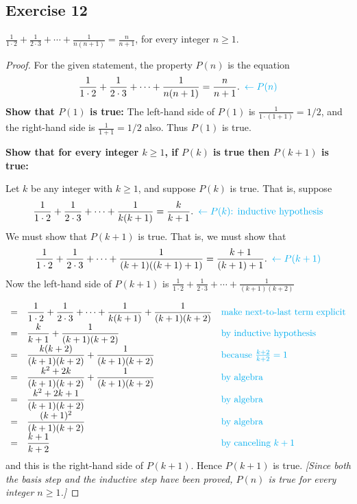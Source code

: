 \documentclass[14pt]{extarticle}
\newcommand{\dps}{\displaystyle}
\newcommand{\from}{\leftarrow}
\newcommand{\cy}{\color{cyan}}
\begin{document}
\subsection{Exercise 12}
$\dps \frac{1}{1 \cdot 2} + \frac{1}{2 \cdot 3} + \cdots + \frac{1}{n(n+1)} = \frac{n}{n+1}$, for every integer $n \geq 1$.

\begin{proof}
For the given statement, the property $P(n)$ is the equation
\[
\dps \frac{1}{1 \cdot 2} + \frac{1}{2 \cdot 3} + \cdots + \frac{1}{n(n+1)} = \frac{n}{n+1}. \,\,\, {\cy \from P(n)}
\]
{\bf Show that $P(1)$ is true:} The left-hand side of $P(1)$ is $\frac{1}{1\cdot (1+1)} = 1/2$, and the right-hand side is $\frac{1}{1+1} = 1/2$ also. Thus $P(1)$ is true.

{\bf Show that for every integer $k \geq 1$, if $P(k)$ is true then $P(k + 1)$ is true:}

Let $k$ be any integer with $k \geq 1$, and suppose $P(k)$ is true. That is, suppose
\[
\dps \frac{1}{1 \cdot 2} + \frac{1}{2 \cdot 3} + \cdots + \frac{1}{k(k+1)} = \frac{k}{k+1}. \,\,\, {\cy \from P(k) \text{: inductive hypothesis}}
\]
We must show that $P(k + 1)$ is true. That is, we must show that
\[
\dps \frac{1}{1 \cdot 2} + \frac{1}{2 \cdot 3} + \cdots + \frac{1}{(k+1)((k+1)+1)} = \frac{k+1}{(k+1)+1}. \,\,\,{\cy \from P(k+1)}
\]
Now the left-hand side of $P(k + 1)$ is $\dps \frac{1}{1 \cdot 2} + \frac{1}{2 \cdot 3} + \cdots + \frac{1}{(k+1)(k+2)}$

\[
\begin{array}{lll}
= & \dps \frac{1}{1 \cdot 2} + \frac{1}{2 \cdot 3} + \cdots + \frac{1}{k(k+1)} + \frac{1}{(k+1)(k+2)} & \text{\cy make next-to-last term explicit} \\
= & \dps \frac{k}{k+1} + \frac{1}{(k+1)(k+2)} & \text{\cy by inductive hypothesis} \\
= & \dps \frac{k(k+2)}{(k+1)(k+2)} + \frac{1}{(k+1)(k+2)} & \text{\cy because $\frac{k+2}{k+2} = 1$} \\
= & \dps \frac{k^2+2k}{(k+1)(k+2)} + \frac{1}{(k+1)(k+2)} & \text{\cy by algebra} \\
= & \dps \frac{k^2+2k+1}{(k+1)(k+2)} & \text{\cy by algebra} \\
= & \dps \frac{(k+1)^2}{(k+1)(k+2)} & \text{\cy by algebra} \\
= & \dps \frac{k+1}{k+2} & \text{\cy by canceling $k+1$}
\end{array}
\]
and this is the right-hand side of $P(k + 1)$. Hence $P(k + 1)$ is true. {\it [Since both the basis step and the inductive step have been proved, $P(n)$ is true for every integer $n \geq 1$.]}
\end{proof}
\end{document}
